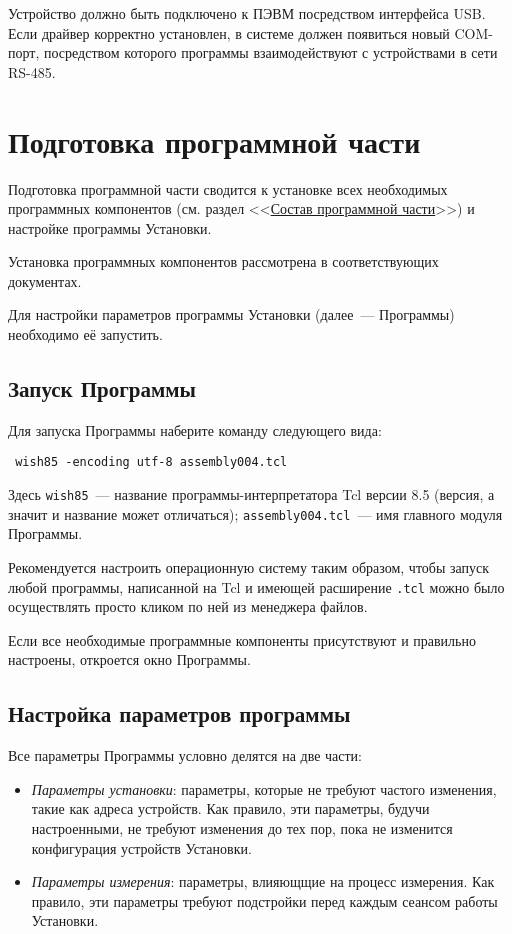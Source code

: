 \documentclass[12pt, a4paper, twocolumn]{report}
\begin{document}
Устройство должно быть подключено к ПЭВМ посредством интерфейса USB. Если драйвер корректно установлен, в системе должен появиться новый COM-порт, посредством которого программы взаимодействуют с устройствами в сети RS-485.

\section{Подготовка программной части}

Подготовка программной части сводится к установке всех необходимых программных компонентов (см. раздел <<\hyperref[sec_software]{Состав программной части}>>) и настройке программы Установки.

Установка программных компонентов рассмотрена в соответствующих документах.

Для настройки параметров программы Установки (далее~--- Программы) необходимо её запустить.

\subsection{Запуск Программы}

Для запуска Программы наберите команду следующего вида:

{\small
\begin{verbatim}
 wish85 -encoding utf-8 assembly004.tcl
\end{verbatim}
}

Здесь {\tt wish85}~--- название программы-интерпретатора Tcl версии 8.5 (версия, а значит и название может отличаться); {\tt assembly004.tcl}~--- имя главного модуля Программы.

Рекомендуется настроить операционную систему таким образом, чтобы запуск любой программы, написанной на Tcl и имеющей расширение {\tt .tcl} можно было осуществлять просто кликом по ней из менеджера файлов.

Если все необходимые программные компоненты присутствуют и правильно настроены, откроется окно Программы.

\subsection{Настройка параметров программы}

Все параметры Программы условно делятся на две части:

\begin{itemize}

\item \emph{Параметры установки}: параметры, которые не требуют частого изменения, такие как адреса устройств. Как правило, эти параметры, будучи настроенными, не требуют изменения до тех пор, пока не изменится конфигурация устройств Установки.

\item \emph{Параметры измерения}: параметры, влияющщие на процесс измерения. Как правило, эти параметры требуют подстройки перед каждым сеансом работы Установки.

\end{itemize}
\end{document}
